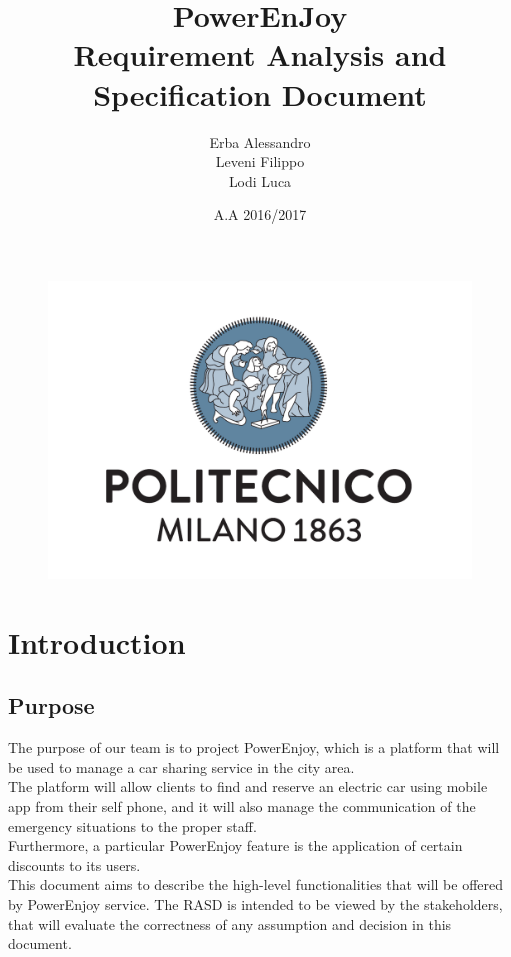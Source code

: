 \documentclass[english]{article}
\begin{document}
\begin{figure}
	\centering
	\includegraphics[scale=0.5]{logo.pdf} 
\end{figure}


\title{PowerEnJoy\\
 Requirement Analysis and Specification Document\\
}

\date{A.A 2016/2017}

\author{Erba Alessandro\\
 Leveni Filippo\\
 Lodi Luca}

\maketitle
\pagebreak{}

\tableofcontents{} \pagebreak{}

\section{Introduction}
	\subsection{Purpose }
	
		The purpose of our team is to project PowerEnjoy, which is  a platform that will be used to manage a car sharing service 
  in the city area.\\
  The platform will allow clients to find and reserve an electric car using mobile app from their self phone, and it will also    manage the communication of the emergency situations to the proper staff.\\
  Furthermore, a particular PowerEnjoy feature is the application of certain discounts to its users.\\
  \tab \tab This document aims to describe the high-level functionalities that will be offered by PowerEnjoy service. The    RASD is intended to be viewed by the stakeholders, that will evaluate the correctness of any assumption and decision
  in this document.
  
\end{document}
